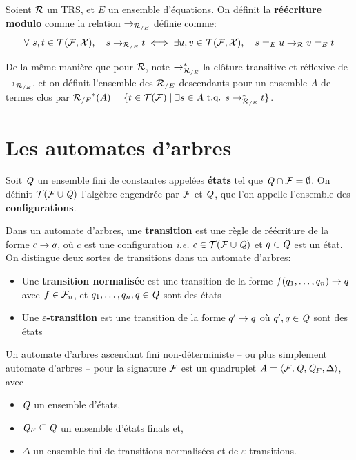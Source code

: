 \begin{definition}
  Soient $\mathcal R$ un TRS, et $E$ un ensemble d'équations. On définit la \textbf{réécriture modulo} comme la relation
  $\rightarrow_{\mathcal R_{/E}}$ définie comme:
  \[\forall\ s, t \in \mathcal{T(F, X)},\quad s \rightarrow_{\mathcal R_{/E}} t \; \Longleftrightarrow \; \exists u, v \in \mathcal{T(F, X)},\quad s =_E u \rightarrow_\mathcal R v =_E t\]
\end{definition}
De la même manière que pour $\mathcal R$, note $\rightarrow_{\mathcal R_{/E}}^*$ la clôture transitive et réflexive de $\rightarrow_{\mathcal R_{/E}}$, et 
on définit l'ensemble des ${\mathcal R_{/E}}$-descendants pour un ensemble $A$ de termes clos par
${\mathcal R_{/E}}^*(A) = \{t \in \mathcal{T(F)} \; | \; \exists s \in A \mbox{ t.q. } s \rightarrow^*_{{\mathcal R_{/E}}} t \}$.

\section{Les automates d'arbres}
\label{sec:automates}

Soit $\mathit Q$ un ensemble fini de constantes appelées \textbf{états} tel que $\mathit Q \cap \mathcal{F}= \emptyset$.
On définit $\mathcal{ T(F \cup \mathit Q)}$ l'algèbre engendrée par $\mathcal{F}$ et $\mathit Q$, que l'on appelle l'ensemble des \textbf{configurations}.

\begin{definition}%
  \label{def:transitions}
  Dans un automate d'arbres, une \textbf{transition} est une règle de réécriture de la forme $c \rightarrow q$, où $c$ est une configuration
  \textit{i.e.} $c \in \mathcal{ T(F \cup \mathit Q)}$ et $q \in \mathit Q$ est un état. On distingue deux sortes de transitions dans un automate d'arbres:
  \begin{itemize}
  \item Une \textbf{transition normalisée} est une transition de la forme $f(q_1, \dots, q_n) \rightarrow q$
    avec $f \in \mathcal{F}_n$, et $q_1, \ldots, q_n, q \in \mathit Q$ sont des états
  \item Une \textbf{$\varepsilon$-transition} est une transition de la forme $q' \rightarrow q$ où $q', q \in \mathit Q$ sont des états
  \end{itemize}
\end{definition}


\begin{definition}%
  Un automate d'arbres ascendant fini non-déterministe -- ou plus simplement automate d'arbres --
  pour la signature $\mathcal{F}$ est un quadruplet $\mathit A= \langle \mathcal{F}, \mathit Q, \mathit Q_F,\Delta \rangle$,
  avec 
  \begin{itemize}
  \item $\mathit Q$ un ensemble d'états,
  \item $\mathit Q_F \subseteq \mathit Q$ un ensemble d'états finals et,
  \item $\Delta$ un ensemble fini de transitions normalisées et de $\varepsilon$-transitions.
  \end{itemize}
\end{definition}

